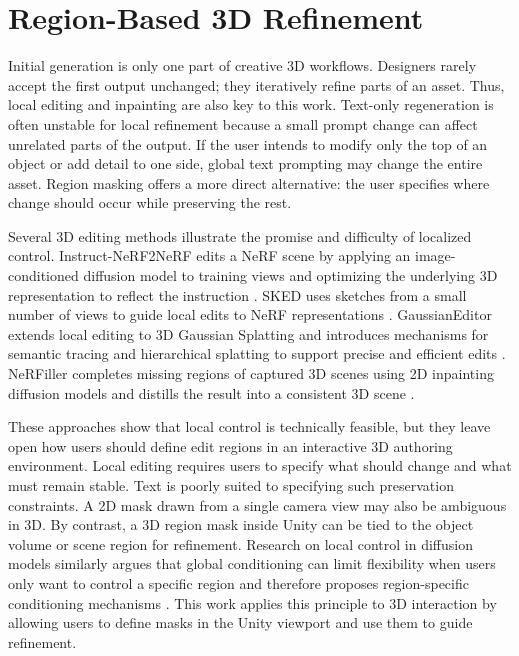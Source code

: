 \documentclass[11pt]{report}
\begin{document}
\section{Region-Based 3D Refinement}
\label{sec:rw-local-editing}

Initial generation is only one part of creative 3D workflows. Designers rarely accept the first output unchanged; they iteratively refine parts of an asset. Thus, local editing and inpainting are also key to this work. Text-only regeneration is often unstable for local refinement because a small prompt change can affect unrelated parts of the output. If the user intends to modify only the top of an object or add detail to one side, global text prompting may change the entire asset. Region masking offers a more direct alternative: the user specifies where change should occur while preserving the rest.

Several 3D editing methods illustrate the promise and difficulty of localized control. Instruct-NeRF2NeRF edits a NeRF scene by applying an image-conditioned diffusion model to training views and optimizing the underlying 3D representation to reflect the instruction \cite{haque2023instruct}. SKED uses sketches from a small number of views to guide local edits to NeRF representations \cite{mikaeili2023sked}. GaussianEditor extends local editing to 3D Gaussian Splatting and introduces mechanisms for semantic tracing and hierarchical splatting to support precise and efficient edits \cite{chen2024gaussianeditor}. NeRFiller completes missing regions of captured 3D scenes using 2D inpainting diffusion models and distills the result into a consistent 3D scene \cite{weber2024nerfiller}. 

These approaches show that local control is technically feasible, but they leave open how users should define edit regions in an interactive 3D authoring environment. Local editing requires users to specify what should change and what must remain stable. Text is poorly suited to specifying such preservation constraints. A 2D mask drawn from a single camera view may also be ambiguous in 3D. By contrast, a 3D region mask inside Unity can be tied to the object volume or scene region for refinement. Research on local control in diffusion models similarly argues that global conditioning can limit flexibility when users only want to control a specific region and therefore proposes region-specific conditioning mechanisms \cite{zhao2023local}. This work applies this principle to 3D interaction by allowing users to define masks in the Unity viewport and use them to guide refinement.
\end{document}
